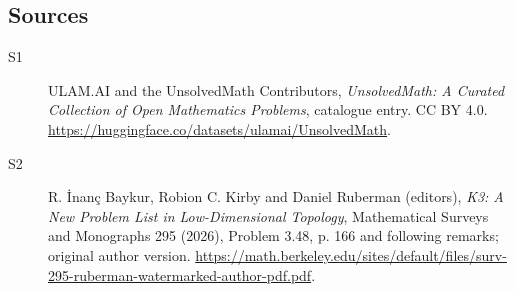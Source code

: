 \documentclass[11pt]{article}
\begin{document}
\subsection{Sources}
\begin{description}
\item[\hypertarget{source:statement:1}{S1}] ULAM.AI and the UnsolvedMath Contributors, \emph{UnsolvedMath: A Curated Collection of Open Mathematics Problems}, catalogue entry. CC BY 4.0. \url{https://huggingface.co/datasets/ulamai/UnsolvedMath}.
\item[\hypertarget{source:statement:2}{S2}] R. İnanç Baykur, Robion C. Kirby and Daniel Ruberman (editors), \emph{K3: A New Problem List in Low-Dimensional Topology}, Mathematical Surveys and Monographs 295 (2026), Problem 3.48, p. 166 and following remarks; original author version. \url{https://math.berkeley.edu/sites/default/files/surv-295-ruberman-watermarked-author-pdf.pdf}.
\end{description}
\label{end:statement}
\end{document}
